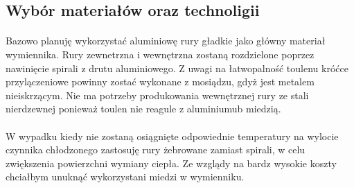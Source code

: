 \subsection{Wybór materiałów oraz technoligii}
\paragraph{}{
    Bazowo planuję wykorzystać aluminiowę rury gładkie jako główny materiał wymiennika.
    Rury zewnetrzna i wewnętrzna zostaną rozdzielone poprzez nawinięcie spirali z drutu aluminiowego.
    Z uwagi na łatwopalność toulenu króćce przylączeniowe powinny zostać wykonane z mosiądzu, gdyż jest metalem nieiskrzącym.
    Nie ma potrzeby produkowania wewnętrznej rury ze stali nierdzewnej ponieważ toulen nie reagule z aluminiumub miedzią.
}
\paragraph{}{
    W wypadku kiedy nie zostaną osiągnięte odpowiednie temperatury na wylocie czynnika chłodzonego zastosuję rury żebrowane zamiast spirali, w celu zwiększenia powierzchni wymiany ciepła.
    Ze wzglądy na bardz wysokie koszty chciałbym unuknąć wykorzystani miedzi w wymienniku.
}